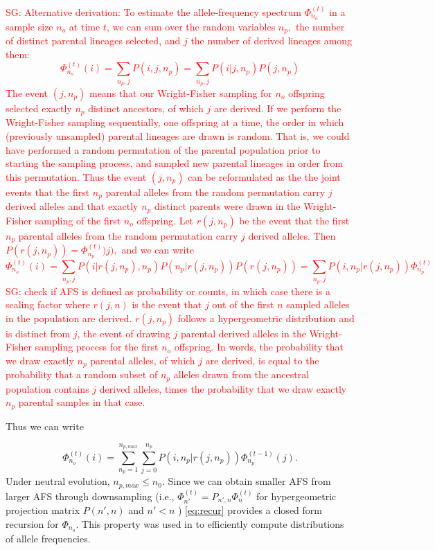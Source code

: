 \documentclass[review]{elsarticle}
\newcommand{\afs}[2]{\Phi_{#1}^{(#2)}}
\newcommand{\sgcomment}[1]{\textcolor{red}{SG: #1}}
\begin{document}
\sgcomment{Alternative derivation:
To estimate the allele-frequency spectrum $\afs{n_o}{t}$ in a sample size $n_o$ at time $t$, 
we can sum over the random variables $n_p,$ the number of distinct parental lineages selected, and $j$ 
the number of derived lineages among them:
 $$\afs{n_o}{t}(i)=\sum_{n_p,j} P(i,j,n_p) =  \sum_{n_p,j} P(i | j,n_p) P(j,n_p) $$
The event $(j,n_p)$ means that our Wright-Fisher sampling for $n_o$ offspring selected exactly $n_p$ distinct ancestors, 
of which $j$ are derived. 
If we perform the Wright-Fisher sampling sequentially, one offspring at a time, the order in which (previously 
unsampled) parental lineages are drawn is random. That is, we could have performed a random permutation of the 
parental population prior to starting the sampling process, and sampled new parental lineages in order from this permutation.  
Thus the event $(j,n_p)$ can be reformulated as the the joint events that the first $n_p$ parental alleles from the random 
permutation carry $j$ derived alleles and that exactly $n_p$ distinct parents were drawn in the Wright-Fisher sampling of the first $n_o$ 
offspring. Let $r(j,n_p)$ be the event that the first $n_p$ parental alleles from the random permutation carry $j$ derived alleles. Then $P(r(j,n_p)) =\afs{n_p}{t} )j),$ and we can write
$$\afs{n_o}{t}(i)=\sum_{n_p,j} P(i | r(j,n_p), n_p)  P(n_p | r(j,n_p) ) P(r(j,n_p)) = \sum_{n_p,j} P(i,n_p | r(j,n_p))  \afs{n_p}{t}$$
 \sgcomment{check if AFS is defined as probability or counts, in which case there is a scaling factor} where $r(j,n)$ is the event that $j$ out of the first $n$ sampled alleles in the population are derived. $r(j,n_p)$ follows a hypergeometric distribution and is distinct from $j$, the event of drawing $j$ parental derived alleles in the Wright-Fisher sampling process for the first $n_o$ offspring.
In words, the probability that we draw exactly $n_p$ parental alleles, of which $j$ are derived, is equal to the probability that a random subset of $n_p$ alleles drawn from the ancestral population contains $j$ derived alleles, times the probability that we draw exactly $n_p$ parental samples in that case.
}
 

Thus we can write
 
 \begin{equation}
\label{eq:recur}
 \afs{n_o}{t}(i)= \sum_{n_p=1}^{n_{p,max}} \sum_{j=0}^{n_p} P(i, n_p | r(j,n_p)) \afs{n_p}{t-1}(j).
\end{equation}
Under neutral evolution, $n_{p,max}\leq n_0$. Since we can obtain smaller AFS from larger AFS through downsampling (i.e., $\afs{n'}{t}  = P_{n',n} \afs{n}{t}$ for hypergeometric projection matrix $P(n',n)$ and $n'<n$ )  \eqref{eq:recur} provides a closed form recursion for $\Phi_{n_o}.$ 
This property was used in \cite{JouganousEtAl2017} to efficiently compute distributions of allele frequencies.  
\end{document}
